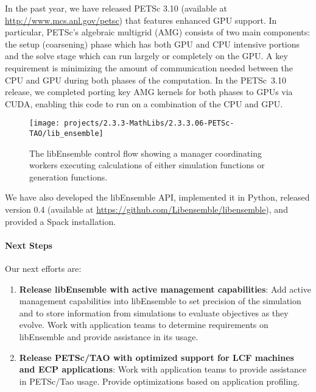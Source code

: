 In the past year, we have released PETSc 3.10 (available at \url{http://www.mcs.anl.gov/petsc})
that features enhanced GPU support.  In particular, PETSc’s algebraic multigrid (AMG) consists 
of two main components: the setup (coarsening) phase which has both GPU and CPU intensive 
portions and the solve stage which can run largely or completely on the GPU. A key 
requirement is minimizing the amount of communication needed between the CPU 
and GPU during both phases of the computation.  In the PETSc~3.10 release, we 
completed porting key AMG kernels for both phases to GPUs via CUDA, enabling
this code to run on a combination of the CPU and GPU.

\begin{figure}
\centering
\texttt{[image: projects/2.3.3-MathLibs/2.3.3.06-PETSc-TAO/lib\_ensemble]}
\caption{The libEnsemble control flow showing a manager coordinating workers executing 
calculations of either simulation functions or generation functions.}
\label{fig:petsc-tao-fig}
\end{figure}

We have also developed the libEnsemble API, implemented it in Python, released 
version 0.4 (available at \url{https://github.com/Libensemble/libensemble}),
and provided a Spack installation.

\paragraph{Next Steps}

Our next efforts are:
\begin{enumerate}
  \item \textbf{Release libEnsemble with active management capabilities}: Add active management 
    capabilities into libEnsemble to set precision of the simulation and to store information 
    from simulations to evaluate objectives as they evolve. Work with application teams to 
    determine requirements on libEnsemble and provide assistance in its usage.
  \item \textbf{Release PETSc/TAO with optimized support for LCF machines and ECP applications}:
    Work with application teams to provide assistance in PETSc/Tao usage. Provide optimizations 
    based on application profiling.
\end{enumerate}

